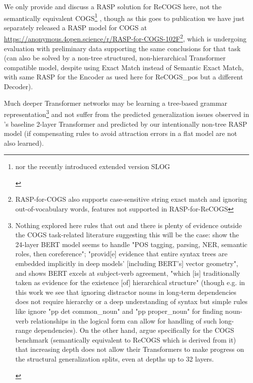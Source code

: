 \documentclass[11pt]{article}
\begin{document}
We only provide and discuss a RASP solution for ReCOGS \cite{Wu2023} here, not the semantically equivalent COGS\footnote{\begin{footnotesize}nor the recently introduced extended version SLOG \cite{li2023slogstructuralgeneralizationbenchmark}\end{footnotesize}} \cite{KimLinzen2020}, though as this goes to publication we have just separately released a RASP model for COGS at \href{https://anonymous.4open.science/r/RASP-for-COGS-102F}{https://anonymous.4open.science/r/RASP-for-COGS-102F}\footnote{RASP-for-COGS also supports case-sensitive string exact match and ignoring out-of-vocabulary words, features not supported in RASP-for-ReCOGS}, which is undergoing evaluation with preliminary data supporting the same conclusions for that task (can also be solved by a non-tree structured, non-hierarchical Transformer compatible model, despite using Exact Match instead of Semantic Exact Match, with same RASP for the Encoder as used here for ReCOGS\_pos but a different Decoder).

Much deeper Transformer networks may be learning a tree-based grammar representation\footnote{\begin{footnotesize}Nothing explored here rules that out and there is plenty of evidence outside the COGS task-related literature suggesting this will be the case: \cite{tenney2019bertrediscoversclassicalnlp} show the 24-layer BERT model seems to handle "POS tagging, parsing, NER, semantic roles, then coreference"; \cite{hewitt-manning-2019-structural} "provid[e] evidence that entire syntax trees are embedded implicitly in deep models’ [including BERT's] vector geometry", and \cite{goldberg2019assessingbertssyntacticabilities} shows BERT excels at subject-verb agreement, "which [is] traditionally taken as evidence for
the existence [of] hierarchical structure" (though e.g. in this work we see that ignoring distractor nouns in long-term dependencies does not require hierarchy or a deep understanding of syntax but simple rules like ignore "pp det common\_noun" and "pp proper\_noun" for finding noun-verb relationships in the logical form can allow for handling of such long-range dependencies). On the other hand, \cite{petty2024impactdepthcompositionalgeneralization} argue specifically for the COGS benchmark (semantically equivalent to ReCOGS which is derived from it) that increasing depth does not allow their Transformers to make progress on the structural generalization splits, even at depths up to 32 layers.
\end{footnotesize}
} and not suffer from the predicted generalization issues observed in \cite{Wu2023}'s baseline 2-layer Transformer and predicted by our intentionally non-tree RASP model (if compensating rules to avoid attraction errors in a flat model are not also learned).
\end{document}
